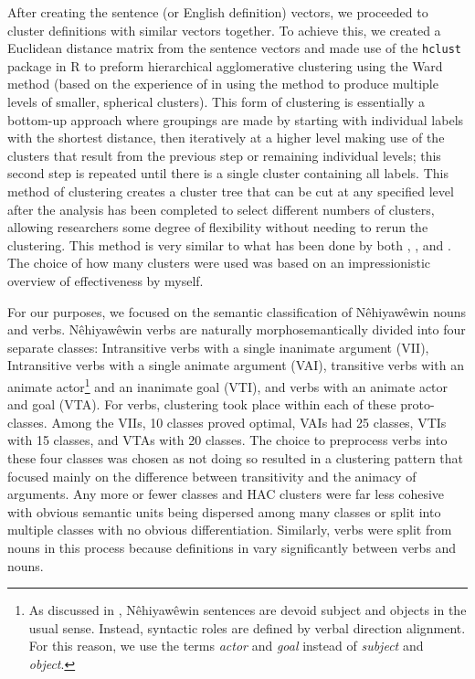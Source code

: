 After creating the sentence (or English definition) vectors, we proceeded to cluster definitions with similar vectors together. To achieve this, we created a Euclidean distance matrix from the sentence vectors and made use of the \texttt{hclust} package in R \citep{R} to preform hierarchical agglomerative clustering using the Ward method (based on the experience of \cite{arppe2008univariate} in using the method to produce multiple levels of smaller, spherical clusters). This form of clustering is essentially a bottom-up approach where groupings are made by starting with individual labels with the shortest distance, then iteratively at a higher level making use of the clusters that result from the previous step or remaining individual levels; this second step is repeated until there is a single cluster containing all labels. This method of clustering creates a cluster tree that can be cut at any specified level after the analysis has been completed to select different numbers of clusters, allowing researchers some degree of flexibility without needing to rerun the clustering. This method is very similar to what has been done by both \citet{arppe2008univariate}, \citet{bresnan2007predicting}, and \citet{divjak2006ways}. The choice of how many clusters were used was based on an impressionistic overview of effectiveness by myself.

For our purposes, we focused on the semantic classification of Nêhiyawêwin nouns and verbs. Nêhiyawêwin verbs are naturally morphosemantically divided into four separate classes: Intransitive verbs with a single inanimate argument (VII), Intransitive verbs with a single animate argument (VAI), transitive verbs with an animate actor\footnote{As discussed in \citet{wolvengrey2005inversion}, Nêhiyawêwin sentences are devoid subject and objects in the usual sense. Instead, syntactic roles are defined by verbal direction alignment. For this reason, we use the terms \textit{actor} and \textit{goal} instead of \textit{subject} and \textit{object}.} and an inanimate goal (VTI), and verbs with an animate actor and goal (VTA). For verbs, clustering took place within each of these proto-classes. Among the VIIs, 10 classes proved optimal, VAIs had 25 classes, VTIs with 15 classes, and VTAs with 20 classes. The choice to preprocess verbs into these four classes was chosen as not doing so resulted in a clustering pattern that focused mainly on the difference between transitivity and the animacy of arguments. Any more or fewer classes and HAC clusters were far less cohesive with obvious semantic units being dispersed among many classes or split into multiple classes with no obvious differentiation. Similarly, verbs were split from nouns in this process because definitions in \citet{Wolvengrey2001} vary significantly between verbs and nouns. 

